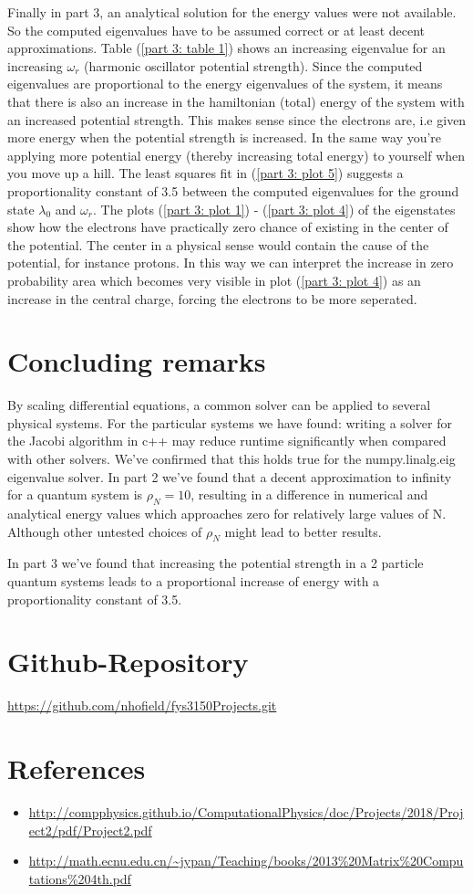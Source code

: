\documentclass[aip,nobalancelastpage,
twocolumn,
rsi,%
 amsmath,amssymb,
 reprint,%
]{revtex4}
\begin{document}
Finally in part 3, an analytical solution for the energy values were not available. So the computed eigenvalues have to be assumed correct or at least decent approximations. Table (\ref{part 3: table 1}) shows an increasing eigenvalue for an increasing $\omega_r$ (harmonic oscillator potential strength). Since the computed eigenvalues are proportional to the energy eigenvalues of the system, it means that there is also an increase in the hamiltonian (total) energy of the system with an increased potential strength. This makes sense since the electrons are, i.e given more energy when the potential strength is increased. In the same way you're applying more potential energy (thereby increasing total energy) to yourself when you move up a hill. The least squares fit in (\ref{part 3: plot 5}) suggests a proportionality constant of 3.5 between the computed eigenvalues for the ground state $\lambda_0$ and $\omega_r$. The plots (\ref{part 3: plot 1}) - (\ref{part 3: plot 4}) of the eigenstates show how the electrons have practically zero chance of existing in the center of the potential. The center in a physical sense would contain the cause of the potential, for instance protons. In this way we can interpret the increase in zero probability area which becomes very visible in plot (\ref{part 3: plot 4}) as an increase in the central charge, forcing the electrons to be more seperated.


\section{Concluding remarks}
By scaling differential equations, a common solver can be applied to several physical systems. For the particular systems we have found: writing a solver for the Jacobi algorithm in c++ may reduce runtime significantly when compared with other solvers. We've confirmed that this holds true for the numpy.linalg.eig eigenvalue solver. In part 2 we've found that a decent approximation to infinity for a quantum system is $\rho_N=10$, resulting in a difference in numerical and analytical energy values which approaches zero for relatively large values of N. Although other untested choices of $\rho_N$ might lead to better results.
\par
In part 3 we've found that increasing the potential strength in a 2 particle quantum systems leads to a proportional increase of energy with a proportionality constant of 3.5.
\section{Github-Repository}
\url{https://github.com/nhofield/fys3150Projects.git}

\section{\label{Referances} References}
\begin{itemize}
\item \url{http://compphysics.github.io/ComputationalPhysics/doc/Projects/2018/Project2/pdf/Project2.pdf}
\item \url{http://math.ecnu.edu.cn/~jypan/Teaching/books/2013%20Matrix%20Computations%204th.pdf}%
\end{itemize}
\end{document}
